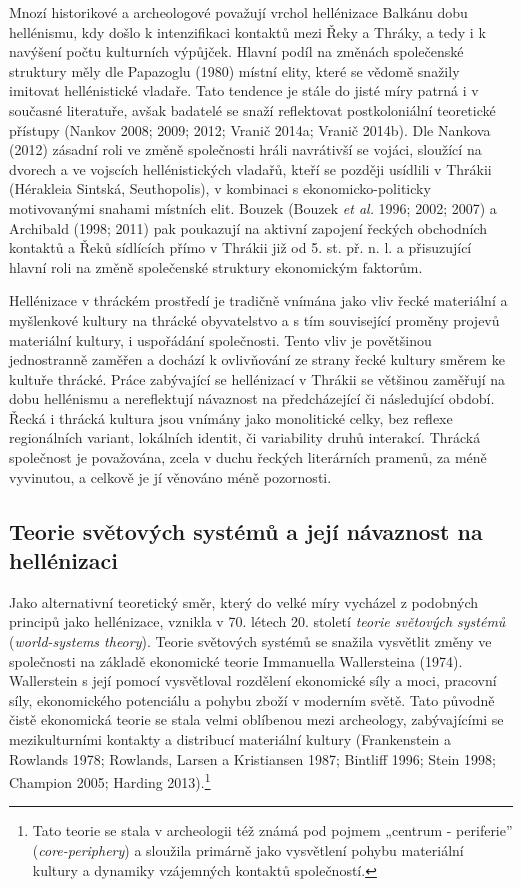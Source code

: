 Mnozí historikové a archeologové považují vrchol hellénizace Balkánu dobu hellénismu, kdy došlo k intenzifikaci kontaktů mezi Řeky a Thráky, a tedy i k navýšení počtu kulturních výpůjček. Hlavní podíl na změnách společenské struktury měly dle Papazoglu (1980) místní elity, které se vědomě snažily imitovat hellénistické vladaře. Tato tendence je stále do jisté míry patrná i v současné literatuře, avšak badatelé se snaží reflektovat postkoloniální teoretické přístupy (Nankov 2008; 2009; 2012; Vranič 2014a; Vranič 2014b). Dle Nankova (2012) zásadní roli ve změně společnosti hráli navrátivší se vojáci, sloužící na dvorech a ve vojscích hellénistických vladařů, kteří se později usídlili v Thrákii (Hérakleia Sintská, Seuthopolis), v kombinaci s ekonomicko-politicky motivovanými snahami místních elit. Bouzek (Bouzek {\em et al.} 1996; 2002; 2007) a Archibald (1998; 2011) pak poukazují na aktivní zapojení řeckých obchodních kontaktů a Řeků sídlících přímo v Thrákii již od 5. st. př. n. l. a přisuzující hlavní roli na změně společenské struktury ekonomickým faktorům.

Hellénizace v thráckém prostředí je tradičně vnímána jako vliv řecké materiální a myšlenkové kultury na thrácké obyvatelstvo a s tím související proměny projevů materiální kultury, i uspořádání společnosti. Tento vliv je povětšinou jednostranně zaměřen a dochází k ovlivňování ze strany řecké kultury směrem ke kultuře thrácké. Práce zabývající se hellénizací v Thrákii se většinou zaměřují na dobu hellénismu a nereflektují návaznost na předcházející či následující období. Řecká i thrácká kultura jsou vnímány jako monolitické celky, bez reflexe regionálních variant, lokálních identit, či variability druhů interakcí. Thrácká společnost je považována, zcela v duchu řeckých literárních pramenů, za méně vyvinutou, a celkově je jí věnováno méně pozornosti.

\subsection[teorie-světových-systémů-a-její-návaznost-na-hellénizaci]{Teorie světových systémů a její návaznost na hellénizaci}

Jako alternativní teoretický směr, který do velké míry vycházel z podobných principů jako hellénizace, vznikla v 70. létech 20. století {\em teorie světových systémů} ({\em world-systems theory}). Teorie světových systémů se snažila vysvětlit změny ve společnosti na základě ekonomické teorie Immanuella Wallersteina (1974). Wallerstein s její pomocí vysvětloval rozdělení ekonomické síly a moci, pracovní síly, ekonomického potenciálu a pohybu zboží v moderním světě. Tato původně čistě ekonomická teorie se stala velmi oblíbenou mezi archeology, zabývajícími se mezikulturními kontakty a distribucí materiální kultury (Frankenstein a Rowlands 1978; Rowlands, Larsen a Kristiansen 1987; Bintliff 1996; Stein 1998; Champion 2005; Harding 2013).\footnote{Tato teorie se stala v archeologii též známá pod pojmem „centrum - periferie” ({\em core-periphery}) a sloužila primárně jako vysvětlení pohybu materiální kultury a dynamiky vzájemných kontaktů společností.}

